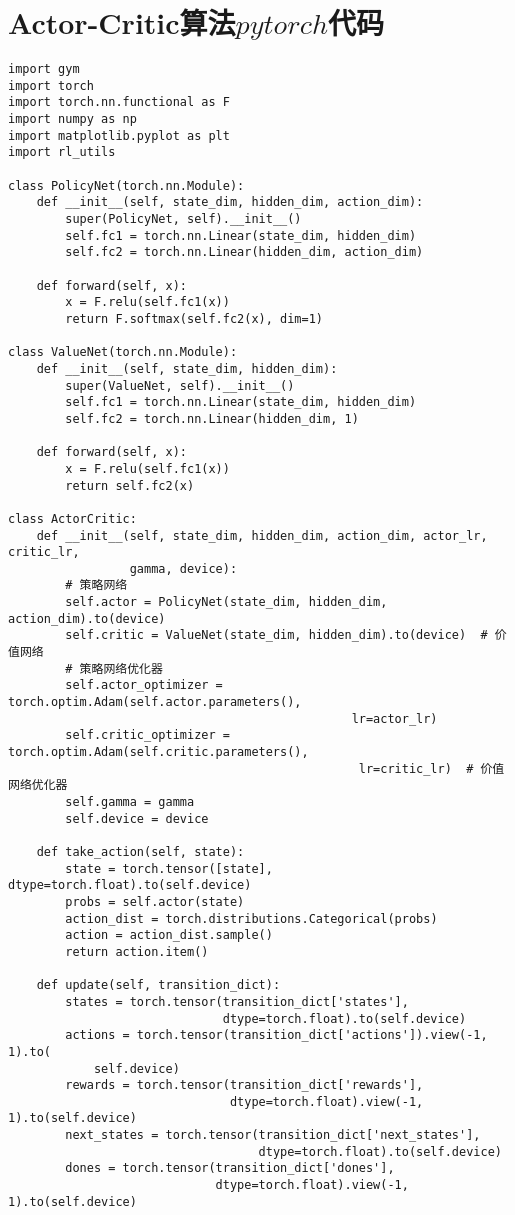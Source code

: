 \section{Actor-Critic算法$pytorch$代码}
\begin{lstlisting}
import gym
import torch
import torch.nn.functional as F
import numpy as np
import matplotlib.pyplot as plt
import rl_utils

class PolicyNet(torch.nn.Module):
    def __init__(self, state_dim, hidden_dim, action_dim):
        super(PolicyNet, self).__init__()
        self.fc1 = torch.nn.Linear(state_dim, hidden_dim)
        self.fc2 = torch.nn.Linear(hidden_dim, action_dim)

    def forward(self, x):
        x = F.relu(self.fc1(x))
        return F.softmax(self.fc2(x), dim=1)

class ValueNet(torch.nn.Module):
    def __init__(self, state_dim, hidden_dim):
        super(ValueNet, self).__init__()
        self.fc1 = torch.nn.Linear(state_dim, hidden_dim)
        self.fc2 = torch.nn.Linear(hidden_dim, 1)

    def forward(self, x):
        x = F.relu(self.fc1(x))
        return self.fc2(x)

class ActorCritic:
    def __init__(self, state_dim, hidden_dim, action_dim, actor_lr, critic_lr,
                 gamma, device):
        # 策略网络
        self.actor = PolicyNet(state_dim, hidden_dim, action_dim).to(device)
        self.critic = ValueNet(state_dim, hidden_dim).to(device)  # 价值网络
        # 策略网络优化器
        self.actor_optimizer = torch.optim.Adam(self.actor.parameters(),
                                                lr=actor_lr)
        self.critic_optimizer = torch.optim.Adam(self.critic.parameters(),
                                                 lr=critic_lr)  # 价值网络优化器
        self.gamma = gamma
        self.device = device

    def take_action(self, state):
        state = torch.tensor([state], dtype=torch.float).to(self.device)
        probs = self.actor(state)
        action_dist = torch.distributions.Categorical(probs)
        action = action_dist.sample()
        return action.item()

    def update(self, transition_dict):
        states = torch.tensor(transition_dict['states'],
                              dtype=torch.float).to(self.device)
        actions = torch.tensor(transition_dict['actions']).view(-1, 1).to(
            self.device)
        rewards = torch.tensor(transition_dict['rewards'],
                               dtype=torch.float).view(-1, 1).to(self.device)
        next_states = torch.tensor(transition_dict['next_states'],
                                   dtype=torch.float).to(self.device)
        dones = torch.tensor(transition_dict['dones'],
                             dtype=torch.float).view(-1, 1).to(self.device)


\end{lstlisting}
